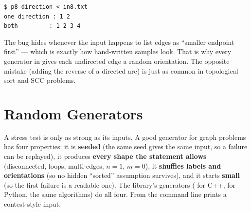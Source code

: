 \begin{diagrambox}
\end{diagrambox}

\begin{lstlisting}[style=trace]
$ p8_direction < in8.txt
one direction : 1 2
both         : 1 2 3 4
\end{lstlisting}

The bug hides whenever the input happens to list edges as ``smaller endpoint first'' --- which is exactly how hand-written samples look. That is why every generator in  gives each undirected edge a random orientation. The opposite mistake (adding the reverse of a directed arc) is just as common in topological sort and SCC problems.

\clneed
\section{Random Generators}
\label{sec:ts-gen}

A stress test is only as strong as its inputs. A good generator for graph problems has four properties: it is \textbf{seeded} (the same seed gives the same input, so a failure can be replayed), it produces \textbf{every shape the statement allows} (disconnected, loops, multi-edges, $n=1$, $m=0$), it \textbf{shuffles labels and orientations} (so no hidden ``sorted'' assumption survives), and it starts \textbf{small} (so the first failure is a readable one). The library's generators ( for C++,  for Python, the same algorithms) do all four. From the command line  prints a contest-style input:


